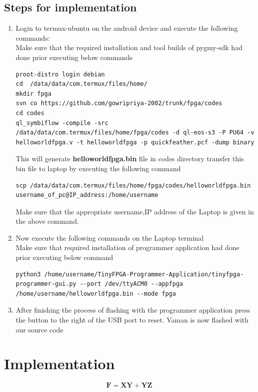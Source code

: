 \documentclass[10pt, a4paper]{article}
\begin{document}
\subsection{Steps for implementation}
\begin{enumerate}
\item Login to termux-ubuntu on the android device and execute the following commands:\\
Make sure that the required installation and tool builds of pygmy-sdk had done prior executing below commands
\begin{lstlisting}
proot-distro login debian
cd  /data/data/com.termux/files/home/
mkdir fpga
svn co https://github.com/gowripriya-2002/trunk/fpga/codes
cd codes
ql_symbiflow -compile -src /data/data/com.termux/files/home/fpga/codes -d ql-eos-s3 -P PU64 -v helloworldfpga.v -t helloworldfpga -p quickfeather.pcf -dump binary
\end{lstlisting}
This will generate \textbf{helloworldfpga.bin} file in codes directory transfer this bin file to laptop by executing the following command
\begin{lstlisting}
scp /data/data/com.termux/files/home/fpga/codes/helloworldfpga.bin username_of_pc@IP_address:/home/username
\end{lstlisting}
Make sure that the appropriate username,IP address of the Laptop is given in the above command.
\item Now execute the following commands on the Laptop terminal\\
Make sure that required installation of programmer application had done prior executing below command
\begin{lstlisting}
python3 /home/username/TinyFPGA-Programmer-Application/tinyfpga-programmer-gui.py --port /dev/ttyACM0 --appfpga /home/username/helloworldfpga.bin --mode fpga
\end{lstlisting}
\item After finishing the process of flashing with the programmer application press the button to the right of the USB port to reset. Vaman is now flashed with our source code
\end{enumerate}
\section*{Implementation}
\begin{equation}
\boldsymbol{F} = \boldsymbol{XY + YZ}
\end{equation}
\end{document}
